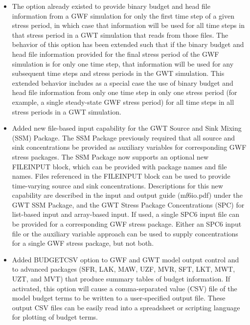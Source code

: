 \documentclass[11pt,twoside,twocolumn]{usgsreport}
\begin{document}
\begin{itemize}
\begin{itemize}
	        \item The option already existed to provide binary budget and head file information from a GWF simulation for only the first time step of a given stress period, in which case that information will be used for all time steps in that stress period in a GWT simulation that reads from those files. The behavior of this option has been extended such that if the binary budget and head file information provided for the final stress period of the GWF simulation is for only one time step, that information will be used for any subsequent time steps and stress periods in the GWT simulation. This extended behavior includes as a special case the use of binary budget and head file information from only one time step in only one stress period (for example, a single steady-state GWF stress period) for all time steps in all stress periods in a GWT simulation.
	        \item Added new file-based input capability for the GWT Source and Sink Mixing (SSM) Package.  The SSM Package previously required that all source and sink concentrations be provided as auxiliary variables for corresponding GWF stress packages.  The SSM Package now supports an optional new FILEINPUT block, which can be provided with package names and file names.  Files referenced in the FILEINPUT block can be used to provide time-varying source and sink concentrations.  Descriptions for this new capability are described in the input and output guide (mf6io.pdf) under the GWT SSM Package, and the GWT Stress Package Concentrations (SPC) for list-based input and array-based input.  If used, a single SPC6 input file can be provided for a corresponding GWF stress package.  Either an SPC6 input file or the auxiliary variable approach can be used to supply concentrations for a single GWF stress package, but not both.
	        \item Added BUDGETCSV option to GWF and GWT model output control and to advanced packages (SFR, LAK, MAW, UZF,  MVR, SFT, LKT, MWT, UZT, and MVT) that produce summary tables of budget information.  If activated, this option will cause a comma-separated value (CSV) file of the model budget terms to be written to a user-specified output file.  These output CSV files can be easily read into a spreadsheet or scripting language for plotting of budget terms.

\end{itemize}
\end{itemize}
\end{document}
